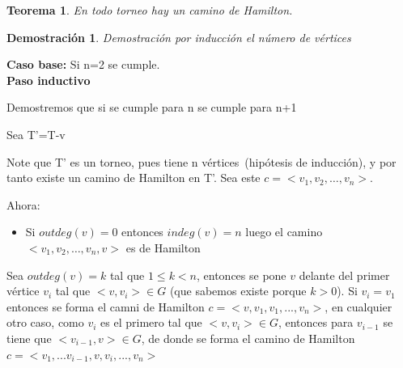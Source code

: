 \documentclass[a4paper,1pt]{report}
\newtheorem*{teo}{Teorema}
\newtheorem*{dem}{Demostración}
\begin{document}
\begin{teo}
 En todo torneo hay un camino de Hamilton.
\end{teo}

\begin{dem}
 Demostración por inducción el número de vértices
\end{dem}

\textbf{Caso base:} Si n=2 se cumple.\\

\textbf{Paso inductivo}

Demostremos que si se cumple para n se cumple para n+1

Sea T'=T-{v}

Note que T' es un torneo, pues tiene n vértices~(hipótesis de inducción), y por tanto existe un camino de Hamilton en T'. Sea este $c=<v_1,v_2,\dots,v_n>$.

Ahora:
\begin{itemize}
 \item Si $outdeg(v)=0$ entonces $indeg(v)=n$ luego el camino $<v_1,v_2,\dots,v_n,v>$ es de Hamilton
\end{itemize}

Sea $outdeg(v)=k$ tal que $1 \leq k < n$, entonces se pone $v$ delante del primer v\'ertice $v_i$ tal que $<v, v_i> \in G$ (que sabemos existe porque $k > 0$).
Si $v_i = v_1$ entonces se forma el camni de Hamilton $c =<v, v_1,v_1,...,v_n>$, en cualquier otro caso, como $v_i$ es el primero tal que $<v, v_i> \in G$, entonces para $v_{i-1}$ se tiene que $<v_{i-1}, v> \in G$, de donde se forma el camino de Hamilton 
$c = <v_1,...v_{i-1}, v, v_i, ..., v_n>$
\end{document}
